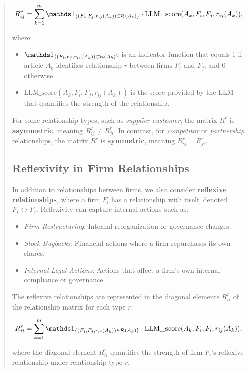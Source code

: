 \begin{quote}
$$
R^r_{ij} = \sum_{k=1}^{m} 
\I{(F_i, F_j, r_{ij}(A_k)) \in \mathcal{R}(A_k)} 
\cdot
\text{LLM\_score}(A_k, F_i, F_j, r_{ij}(A_k)),
$$

where:
\begin{itemize}
    \item $\I{(F_i, F_j, r_{ij}(A_k)) \in \mathcal{R}(A_k)}$ is an indicator function that equals 1 if article $ A_k $ identifies relationship $ r $ between firms $ F_i $ and $ F_j $, and 0 otherwise.
    \item $ \text{LLM\_score}(A_k, F_i, F_j, r_{ij}(A_k)) $ is the score provided by the LLM that quantifies the strength of the relationship.
\end{itemize}

For some relationship types, such as \textit{supplier-customer}, the matrix $ R^r $ is \textbf{asymmetric}, meaning $ R^r_{ij} \neq R^r_{ji} $. In contrast, for \textit{competitor} or \textit{partnership} relationships, the matrix $ R^r $ is \textbf{symmetric}, meaning $ R^r_{ij} = R^r_{ji} $.

\subsection{Reflexivity in Firm Relationships}

In addition to relationships between firms, we also consider \textbf{reflexive relationships}, where a firm $ F_i $ has a relationship with itself, denoted $ F_i \leftrightarrow F_i $. Reflexivity can capture internal actions such as:
\begin{itemize}
    \item \textit{Firm Restructuring}: Internal reorganization or governance changes.
    \item \textit{Stock Buybacks}: Financial actions where a firm repurchases its own shares.
    \item \textit{Internal Legal Actions}: Actions that affect a firm's own internal compliance or governance.
\end{itemize}

The reflexive relationships are represented in the diagonal elements $ R^r_{ii} $ of the relationship matrix for each type $ r $:

$$
R^r_{ii} = \sum_{k=1}^{m} 
\I{(F_i, F_j, r_{ij}(A_k)) \in \mathcal{R}(A_k)}
\cdot \text{LLM\_score}(A_k, F_i, F_i, r_{ij}(A_k)),
$$

where the diagonal element $ R^r_{ii} $ quantifies the strength of firm $ F_i $'s reflexive relationship under relationship type $r$.


\end{quote}
